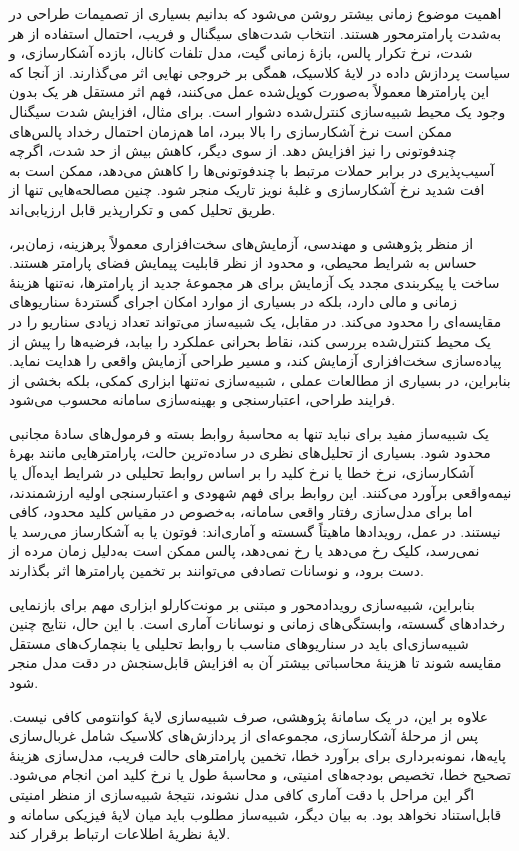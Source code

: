 اهمیت موضوع زمانی بیشتر روشن می‌شود که بدانیم بسیاری از تصمیمات طراحی در  به‌شدت پارامترمحور هستند. انتخاب شدت‌های سیگنال و فریب، احتمال استفاده از هر شدت، نرخ تکرار پالس، بازهٔ زمانی گیت، مدل تلفات کانال، بازده آشکارسازی، و سیاست پردازش داده در لایهٔ کلاسیک، همگی بر خروجی نهایی اثر می‌گذارند. از آنجا که این پارامترها معمولاً به‌صورت کوپل‌شده عمل می‌کنند، فهم اثر مستقل هر یک بدون وجود یک محیط شبیه‌سازی کنترل‌شده دشوار است. برای مثال، افزایش شدت سیگنال ممکن است نرخ آشکارسازی را بالا ببرد، اما هم‌زمان احتمال رخداد پالس‌های چندفوتونی را نیز افزایش دهد. از سوی دیگر، کاهش بیش از حد شدت، اگرچه آسیب‌پذیری در برابر حملات مرتبط با چندفوتونی‌ها را کاهش می‌دهد، ممکن است به افت شدید نرخ آشکارسازی و غلبهٔ نویز تاریک منجر شود. چنین مصالحه‌هایی تنها از طریق تحلیل کمی و تکرارپذیر قابل ارزیابی‌اند.

از منظر پژوهشی و مهندسی، آزمایش‌های سخت‌افزاری  معمولاً پرهزینه، زمان‌بر، حساس به شرایط محیطی، و محدود از نظر قابلیت پیمایش فضای پارامتر هستند. ساخت یا پیکربندی مجدد یک آزمایش برای هر مجموعهٔ جدید از پارامترها، نه‌تنها هزینهٔ زمانی و مالی دارد، بلکه در بسیاری از موارد امکان اجرای گستردهٔ سناریوهای مقایسه‌ای را محدود می‌کند. در مقابل، یک شبیه‌ساز می‌تواند تعداد زیادی سناریو را در یک محیط کنترل‌شده بررسی کند، نقاط بحرانی عملکرد را بیابد، فرضیه‌ها را پیش از پیاده‌سازی سخت‌افزاری آزمایش کند، و مسیر طراحی آزمایش واقعی را هدایت نماید. بنابراین، در بسیاری از مطالعات عملی ، شبیه‌سازی نه‌تنها ابزاری کمکی، بلکه بخشی از فرایند طراحی، اعتبارسنجی و بهینه‌سازی سامانه محسوب می‌شود.

یک شبیه‌ساز مفید برای  نباید تنها به محاسبهٔ روابط بسته و فرمول‌های سادهٔ مجانبی محدود شود. بسیاری از تحلیل‌های نظری در ساده‌ترین حالت، پارامترهایی مانند بهرهٔ آشکارسازی، نرخ خطا یا نرخ کلید را بر اساس روابط تحلیلی در شرایط ایده‌آل یا نیمه‌واقعی برآورد می‌کنند. این روابط برای فهم شهودی و اعتبارسنجی اولیه ارزشمندند، اما برای مدل‌سازی رفتار واقعی سامانه، به‌خصوص در مقیاس کلید محدود، کافی نیستند. در عمل، رویدادها ماهیتاً گسسته و آماری‌اند: فوتون یا به آشکارساز می‌رسد یا نمی‌رسد، کلیک رخ می‌دهد یا رخ نمی‌دهد، پالس ممکن است به‌دلیل زمان مرده از دست برود، و نوسانات تصادفی می‌توانند بر تخمین پارامترها اثر بگذارند.

بنابراین، شبیه‌سازی رویدادمحور و مبتنی بر مونت‌کارلو ابزاری مهم برای بازنمایی رخدادهای گسسته، وابستگی‌های زمانی و نوسانات آماری است. با این حال، نتایج چنین شبیه‌سازی‌ای باید در سناریوهای مناسب با روابط تحلیلی یا بنچمارک‌های مستقل مقایسه شوند تا هزینهٔ محاسباتی بیشتر آن به افزایش قابل‌سنجش در دقت مدل منجر شود.

علاوه بر این، در یک سامانهٔ پژوهشی، صرف شبیه‌سازی لایهٔ کوانتومی کافی نیست. پس از مرحلهٔ آشکارسازی، مجموعه‌ای از پردازش‌های کلاسیک شامل غربال‌سازی پایه‌ها، نمونه‌برداری برای برآورد خطا، تخمین پارامترهای حالت فریب، مدل‌سازی هزینهٔ تصحیح خطا، تخصیص بودجه‌های امنیتی، و محاسبهٔ طول یا نرخ کلید امن انجام می‌شود. اگر این مراحل با دقت آماری کافی مدل نشوند، نتیجهٔ شبیه‌سازی از منظر امنیتی قابل‌استناد نخواهد بود. به بیان دیگر، شبیه‌ساز مطلوب باید میان لایهٔ فیزیکی سامانه و لایهٔ نظریهٔ اطلاعات ارتباط برقرار کند.

